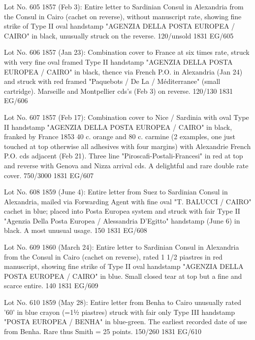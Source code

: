 \documentclass[justified]{tufte-book}
\begin{document}
%
{Lot No. 605
1857 (Feb 3): Entire letter to Sardinian Consul in Alexandria from the Consul in Cairo (cachet on reverse), without manuscript rate, showing fine strike of Type II oval handstamp "AGENZIA DELLA POSTA EUROPEA / CAIRO" in black, unusually struck on the reverse. 120/unsold }%
{1831}%
{EG/605}%
{}%
{}
{}%
{}

%
{
Lot No. 606
1857 (Jan 23): Combination cover to France at six times rate, struck with very fine oval framed Type II handstamp "AGENZIA DELLA POSTA EUROPEA / CAIRO" in black, thence via French P.O. in Alexandria (Jan 24) and struck with red framed "Paquebots / De La / Méditerranee" (small cartridge). Marseille and Montpellier cds's (Feb 3) on reverse. 120/130 }%
{1831}%
{EG/606}%
{}%
{}
{}%
{}

%
{Lot No. 607
1857 (Feb 17): Combination cover to Nice / Sardinia with oval Type II handstamp "AGENZIA DELLA POSTA EUROPEA / CAIRO" in black, franked by France 1853 40 c. orange and 80 c. carmine (2 examples, one just touched at top otherwise all adhesives with four margins) with Alexandrie French P.O. cds adjacent (Feb 21).  Three line "Piroscafi-Postali-Francesi" in red at top and reverse with Genova and Nizza arrival cds. A delightful and rare double rate cover. 750/3000 }%
{1831}%
{EG/607}%
{}%
{}
{}%
{}

%
{Lot No. 608
1859 (June 4): Entire letter from Suez to Sardinian Consul in Alexandria, mailed via Forwarding Agent with fine oval "T. BALUCCI / CAIRO" cachet in blue; placed into Posta Europea system and struck with fair Type II "Agenzia Della Posta Europea / Alessandria D'Egitto" handstamp (June 6) in black. A most unusual usage. 150 }%
{1831}%
{EG/608}%
{}%
{}
{}%
{}


%
{Lot No. 609
1860 (March 24): Entire letter to Sardinian Consul in Alexandria from the Consul in Cairo (cachet on reverse), rated 1 1/2 piastres in red manuscript, showing fine strike of Type II oval handstamp "AGENZIA DELLA POSTA EUROPEA / CAIRO" in blue. Small closed tear at top but a fine and scarce entire. 140 }%
{1831}%
{EG/609}%
{}%
{}
{}%
{}

%
{Lot No. 610
1859 (May 28): Entire letter from Benha to Cairo unusually rated '60' in blue crayon (=1½ piastres) struck with fair only Type III handstamp "POSTA EUROPEA / BENHA" in blue-green. The earliest recorded date of use from Benha. Rare thus Smith = 25 points. 150/260  }%
{1831}%
{EG/610}%
{}%
{}
{}%
{}
\end{document}
